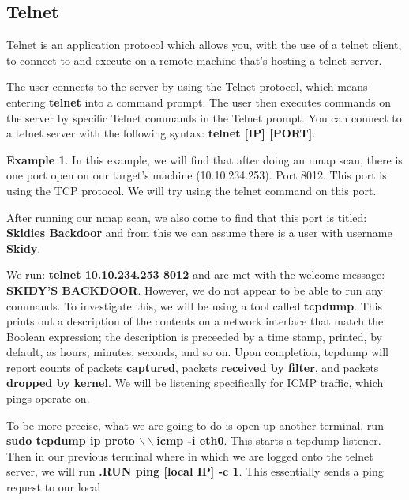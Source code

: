 \documentclass[12pt]{article}
\theoremstyle{definition}
\theoremstyle{definition}
\newtheorem{exmp}{Example}[section]
\begin{document}
    \subsection{Telnet}
        Telnet is an application protocol which allows you, with the use of
        a telnet client, to connect to and execute on a remote machine that's
        hosting a telnet server.\par The user connects to the server by using the
        Telnet protocol, which means entering \textbf{telnet} into a command
        prompt. The user then executes commands on the server by specific Telnet
        commands in the Telnet prompt. You can connect to a telnet server with the
        following syntax: \textbf{telnet [IP] [PORT]}.
        \begin{exmp}
            In this example, we will find that after doing an nmap scan, there
            is one port open on our target's machine (10.10.234.253). 
            Port 8012. This port is
            using the TCP protocol. We will try using the telnet command on
            this port.\par After running our nmap scan, we also come to find
            that this port is titled: \textbf{Skidies Backdoor} and from this
            we can assume there is a user with username \textbf{Skidy}.\par We run:
            \textbf{telnet 10.10.234.253 8012} and are met with the welcome
            message: \textbf{SKIDY'S BACKDOOR}. However, we do not appear to be
            able to run any commands. To investigate this, we will be using a tool
            called \textbf{tcpdump}. This prints out a description of the contents
            on a network interface that match the Boolean expression; the
            description is preceeded by a time stamp, printed, by default, as
            hours, minutes, seconds, and so on. Upon completion, tcpdump will
            report counts of packets \textbf{captured}, packets
            \textbf{received by filter}, and packets \textbf{dropped by kernel}. We
            will be listening specifically for ICMP traffic, which pings operate
            on.\par To be more precise, what we are going to do is open up another
            terminal, run 
            \textbf{sudo tcpdump ip proto $\backslash\backslash$icmp -i eth0}. This
            starts a tcpdump listener. Then in our previous terminal where in which
            we are logged onto the telnet server, we will run \textbf{.RUN ping
            [local IP] -c 1}. This essentially sends a ping request to our local

\end{exmp}
\end{document}
